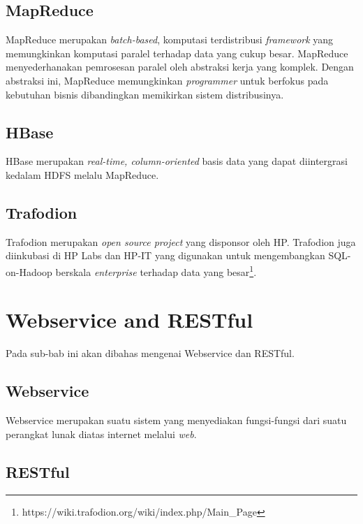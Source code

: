 \subsection{MapReduce}
\label{subsec:mapreduce}

\hspace{0,5cm}MapReduce merupakan \textit{batch-based}, komputasi terdistribusi \textit{framework} yang memungkinkan komputasi paralel terhadap data yang cukup besar. MapReduce menyederhanakan pemrosesan paralel oleh abstraksi kerja yang komplek. Dengan abstraksi ini, MapReduce memungkinkan \textit{programmer} untuk berfokus pada kebutuhan bisnis dibandingkan memikirkan sistem distribusinya.

\subsection{HBase}
\label{subsec:hbase}

HBase merupakan \textit{real-time, column-oriented} basis data yang dapat diintergrasi kedalam HDFS melalu MapReduce.


\subsection{Trafodion}
\label{subsec:trafodian}

Trafodion merupakan \textit{open source project} yang disponsor oleh HP. Trafodion juga diinkubasi di HP Labs dan HP-IT yang digunakan untuk mengembangkan SQL-on-Hadoop berskala \textit{enterprise} terhadap data yang besar\footnote{https://wiki.trafodion.org/wiki/index.php/Main\_Page}. 

\section{Webservice and RESTful}
\label{sec:webserviceansrestful}

Pada sub-bab ini akan dibahas mengenai Webservice dan RESTful.

\subsection{Webservice}
\label{subsec:webservice}

Webservice merupakan suatu sistem yang menyediakan fungsi-fungsi dari suatu perangkat lunak diatas internet melalui \textit{web}.

\subsection{RESTful}
\label{subsec:restful}

